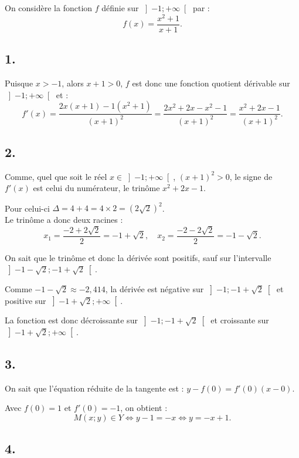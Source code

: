 On considère la fonction \(f\) définie sur \(\left] -1 ; +\infty \right[\) par :
	\[
	f(x) = \dfrac{x^2 + 1}{x + 1}.
	\]
	
	\subsection*{1.}
	
	Puisque \(x > -1\), alors \(x + 1 > 0\), \(f\) est donc une fonction quotient dérivable sur \(\left] -1 ; +\infty \right[\) et :
	\[
	f'(x) = \dfrac{2x(x + 1) - 1(x^2 + 1)}{(x + 1)^2} = \dfrac{2x^2 + 2x - x^2 - 1}{(x + 1)^2} = \dfrac{x^2 + 2x - 1}{(x + 1)^2}.
	\]
	
	\subsection*{2.}
	
	Comme, quel que soit le réel \(x \in \left] -1 ; +\infty \right[\), \((x + 1)^2 > 0\), le signe de \(f'(x)\) est celui du numérateur, le trinôme \(x^2 + 2x - 1\).
	
	Pour celui-ci \(\Delta = 4 + 4 = 4 \times 2 = (2\sqrt{2})^2\).\\ Le trinôme a donc deux racines :
	\[
	x_1 = \dfrac{-2 + 2\sqrt{2}}{2} = -1 + \sqrt{2}, \quad x_2 = \dfrac{-2 - 2\sqrt{2}}{2} = -1 - \sqrt{2}.
	\]
	
	On sait que le trinôme et donc la dérivée sont positifs, sauf sur l'intervalle \(\left] -1 - \sqrt{2} ; -1 + \sqrt{2} \right[\).
	
	Comme \(-1 - \sqrt{2} \approx -2,414\), la dérivée est négative sur \(\left] -1 ; -1 + \sqrt{2} \right[\) et positive sur \(\left] -1 + \sqrt{2} ; +\infty \right[\).
	
	La fonction est donc décroissante sur \(\left] -1 ; -1 + \sqrt{2} \right[\) et croissante sur \(\left] -1 + \sqrt{2} ; +\infty \right[\).
	
	\subsection*{3.}
	
	On sait que l'équation réduite de la tangente est : \(y - f(0) = f'(0)(x - 0)\).
	
	Avec \(f(0) = 1\) et \(f'(0) = -1\), on obtient :
	\[
	M(x ; y) \in Y \Leftrightarrow y - 1 = -x \Leftrightarrow y = -x + 1.
	\]
	
	\subsection*{4.}
	
